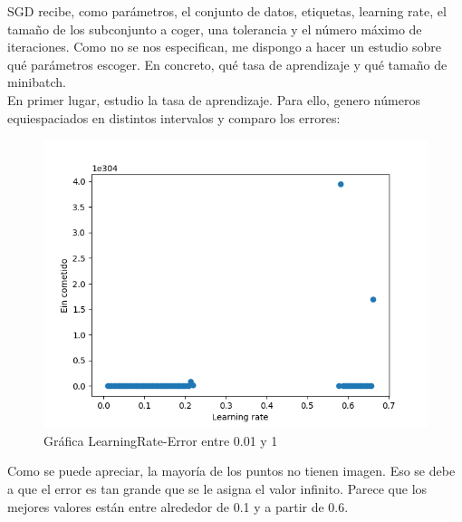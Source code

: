 SGD recibe, como parámetros, el conjunto de datos, etiquetas, learning rate, el tamaño de los subconjunto a coger, una tolerancia y el número máximo de iteraciones. Como no se nos especifican, me dispongo a hacer un estudio sobre qué parámetros escoger. En concreto, qué tasa de aprendizaje y qué tamaño de minibatch. \\

En primer lugar, estudio la tasa de aprendizaje. Para ello, genero números equiespaciados en distintos intervalos y comparo los errores:


\begin{figure}[H] %
	\centering
	\includegraphics[scale=0.6]{error1.png}  %
	\caption{Gráfica LearningRate-Error entre 0.01 y 1} 
	\label{fig:error1}
\end{figure}

Como se puede apreciar, la mayoría de los puntos no tienen imagen. Eso se debe a que el error es tan grande que se le asigna el valor infinito. Parece que los mejores valores están entre alrededor de 0.1 y a partir de 0.6.

